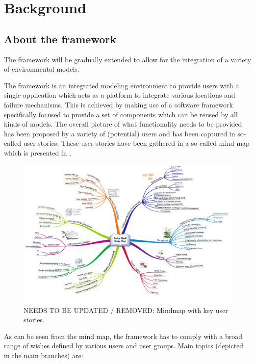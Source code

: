 
\chapter{Background}
\label{chap:ds_background}

\section{About the framework}
\label{sec:aboutdeltashell}

The framework will be gradually extended to allow for the integration of a variety of environmental models.

The framework is an integrated modeling environment to provide users with a single application which acts as a platform to integrate various locations and failure mechanisms. This is achieved by making use of a software framework specifically focused to provide a set of components which can be reused by all kinds of models. The overall picture of what functionality needs to be provided has been proposed by a variety of (potential) users and has been captured in so-called user stories. These user stories have been gathered in a so-called mind map which is presented in .
\begin{figure}[!ht]
\center
\includegraphics[width=\textwidth]{Figures/Chapter_background/DeltaShellStoryMap.pdf}
\caption{NEEDS TO BE UPDATED / REMOVED: Mindmap with key user stories.}
\label{Fig:MindMapUserStories}
\end{figure}
As can be seen from the mind map, the framework has to comply with a broad range of wishes defined by various users and user groups. Main topics (depicted in the main branches) are: 
